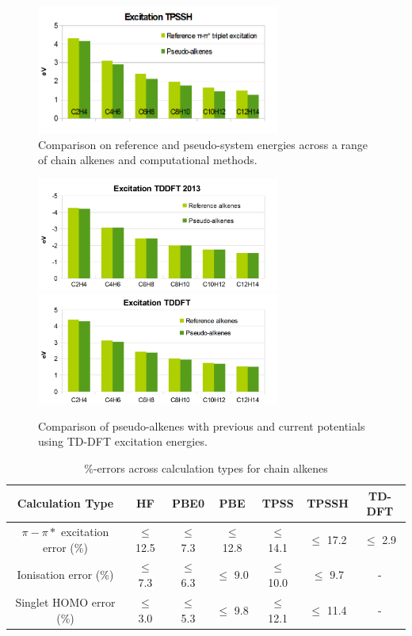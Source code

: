 \documentclass[journal=jctcce,manuscript=article]{achemso}
\begin{document}
\begin{figure}
\includegraphics[width=8cm]{tpssh_excitation}
\caption{Comparison on reference and pseudo-system energies across a range of chain alkenes and computational methods.}
\label{fig:alkenes_hf_dft}
\end{figure}
\begin{figure}
\includegraphics[width=8cm]{tddft_excitation_cd}
\includegraphics[width=8cm]{tddft_excitation}
\caption{Comparison of pseudo-alkenes with previous\cite{drujon_pseudopotentials_2013} and current potentials using TD-DFT excitation energies.}
\label{fig:alkenes_tddft}
\end{figure}

\begin{table}[ht]
\caption{\%-errors across calculation types for chain alkenes}
\begin{tabular}{c c c c c c c}
\hline\hline
Calculation Type & HF & PBE0 & PBE & TPSS & TPSSH & TD-DFT \\
\hline
\(\pi - \pi*\) excitation error (\%) & \(\leq\) 12.5 &\(\leq\) 7.3 & \(\leq\) 12.8 & \(\leq\) 14.1 & \(\leq\) 17.2 & \(\leq\) 2.9 \\
Ionisation error (\%) & \(\leq\) 7.3 & \(\leq\) 6.3 & \(\leq\) 9.0 & \(\leq\) 10.0 & \(\leq\) 9.7 & - \\
Singlet HOMO error (\%) & \(\leq\) 3.0 & \(\leq\) 5.3 & \(\leq\) 9.8 & \(\leq\) 12.1 & \(\leq\) 11.4 & - \\
\hline
\end{tabular}
\label{table:alkene_errors}
\end{table}
\end{document}
